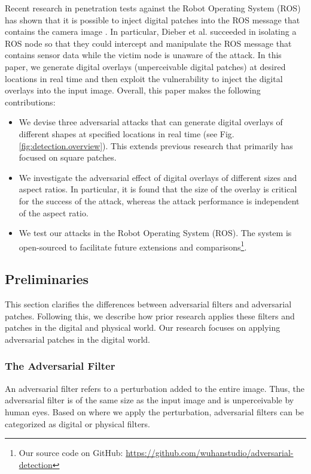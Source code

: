 Recent research in penetration tests against the Robot Operating System (ROS) has shown that it is possible to inject digital patches into the ROS message that contains the camera image \citep{dieber2020penetration}. In particular, Dieber et al. succeeded in isolating a ROS node so that they could intercept and manipulate the ROS message that contains sensor data while the victim node is unaware of the attack. In this paper, we generate digital overlays (unperceivable digital patches) at desired locations in real time and then exploit the vulnerability to inject the digital overlays into the input image. Overall, this paper makes the following contributions:
\begin{itemize}
    \item We devise three adversarial attacks that can generate digital overlays of different shapes at specified locations in real time (see Fig. \ref{fig:detection.overview}). This extends previous research that primarily has focused on square patches.
    \item We investigate the adversarial effect of digital overlays of different sizes and aspect ratios. In particular, it is found that the size of the overlay is critical for the success of the attack, whereas the attack performance is independent of the aspect ratio. 
    \item We test our attacks in the Robot Operating System (ROS). The system is open-sourced to facilitate future extensions and comparisons\footnote{Our source code on GitHub: \url{https://github.com/wuhanstudio/adversarial-detection}}.
\end{itemize}

\subsection{Preliminaries}
\label{section_preliminaries}

This section clarifies the differences between adversarial filters and adversarial patches. Following this, we describe how prior research applies these filters and patches in the digital and physical world. Our research focuses on applying adversarial patches in the digital world.

\subsubsection{The Adversarial Filter}

An adversarial filter refers to a perturbation added to the entire image. Thus, the adversarial filter is of the same size as the input image and is unperceivable by human eyes. Based on where we apply the perturbation, adversarial filters can be categorized as digital or physical filters.

